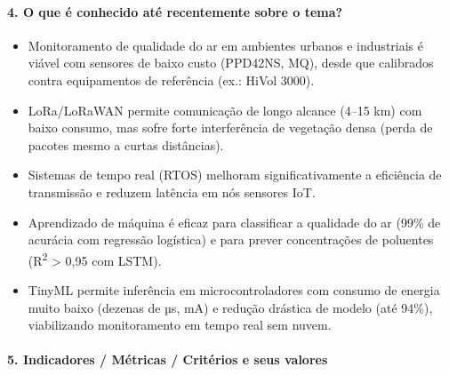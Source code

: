 \paragraph*{4. O que é conhecido até recentemente sobre o tema?}

\begin{itemize}[leftmargin=*]
  \item Monitoramento de qualidade do ar em ambientes urbanos e industriais é viável com sensores de baixo custo (PPD42NS, MQ), desde que calibrados contra equipamentos de referência (ex.: HiVol 3000).
  \item LoRa/LoRaWAN permite comunicação de longo alcance (4–15 km) com baixo consumo, mas sofre forte interferência de vegetação densa (perda de pacotes mesmo a curtas distâncias).
  \item Sistemas de tempo real (RTOS) melhoram significativamente a eficiência de transmissão e reduzem latência em nós sensores IoT.
  \item Aprendizado de máquina é eficaz para classificar a qualidade do ar (99\% de acurácia com regressão logística) e para prever concentrações de poluentes (R\textsuperscript{2} > 0,95 com LSTM).
  \item TinyML permite inferência em microcontroladores com consumo de energia muito baixo (dezenas de µs, mA) e redução drástica de modelo (até 94\%), viabilizando monitoramento em tempo real sem nuvem.
\end{itemize}

\paragraph*{5. Indicadores / Métricas / Critérios e seus valores}

